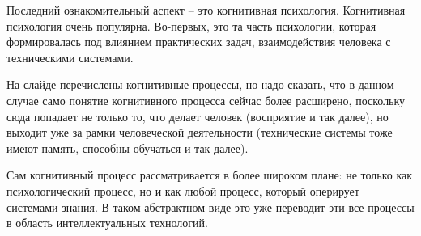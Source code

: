 \documentclass[main.tex]{subfiles}
\begin{document}

Последний ознакомительный аспект -- это когнитивная психология.
Когнитивная психология очень популярна.
Во-первых, это та часть психологии, которая формировалась под влиянием практических задач, взаимодействия человека с техническими системами.

На слайде перечислены когнитивные процессы, но надо сказать, что в данном случае само понятие когнитивного процесса сейчас более расширено, поскольку сюда попадает не только то, что делает человек (восприятие и так далее), но выходит уже за рамки человеческой деятельности (технические системы тоже имеют память, способны обучаться и так далее).

Сам когнитивный процесс рассматривается в более широком плане: не только как психологический процесс, но и как любой процесс, который оперирует системами знания.
В таком абстрактном виде это уже переводит эти все процессы в область интеллектуальных технологий.
\end{document}
